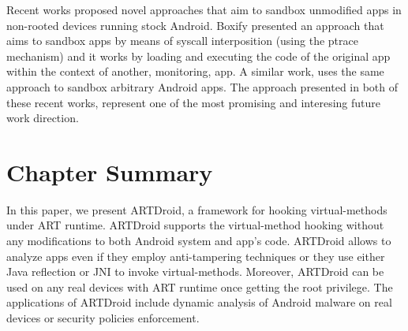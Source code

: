 Recent works proposed novel approaches that aim to sandbox unmodified apps in non-rooted devices running stock Android. Boxify\cite{backes2015boxify} presented an approach that aims to sandbox apps by means of syscall interposition (using the ptrace mechanism) and it works by loading and executing the code of the original app within the context of another, monitoring, app. A similar work, \cite{bianchi2015njas} uses the same approach to sandbox arbitrary Android apps. The approach presented in both of these recent works, represent one of the most promising and interesing future work direction.

\section{Chapter Summary}
\label{sec:conclusion}
In this paper, we present ARTDroid, a framework for hooking virtual-methods under ART runtime. ARTDroid supports the virtual-method hooking without any modifications to both Android system and app's code. ARTDroid allows to analyze apps even if they employ anti-tampering techniques or they use either Java reflection or JNI to invoke virtual-methods. Moreover, ARTDroid can be used on any real devices with ART runtime once getting the root privilege. The applications of ARTDroid include dynamic analysis of Android malware on real devices or security policies enforcement.








